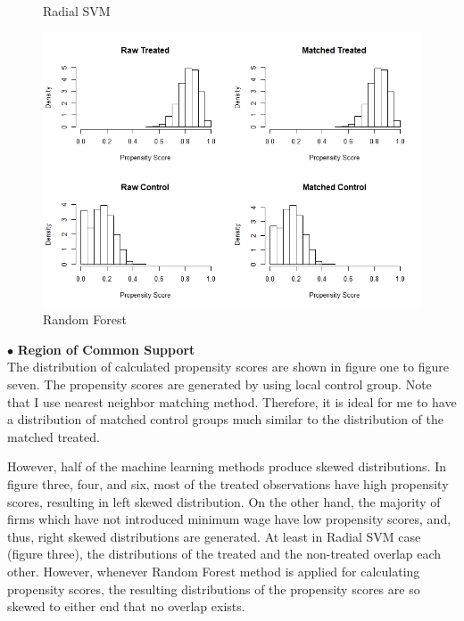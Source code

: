 \documentclass[11pt,a4paper,oneside]{article}
\begin{document}
\begin{figure}[!t]
  \caption{Radial SVM}\label{fig:histogram3}
\endminipage\hfill
{}
  \includegraphics[width=\linewidth]{Figures/local_rf_hist.jpeg}
  \caption{Random Forest}\label{fig:histogram4}
\endminipage\hfill
\end{figure}
$\bullet$ \textbf{Region of Common Support}\\
The distribution of calculated propensity scores are shown in figure one to figure seven. The propensity scores are generated by using local control group. Note that I use nearest neighbor matching method. Therefore, it is ideal for me to have a distribution of matched control groups much similar to the distribution of the matched treated. 
\par 
However, half of the machine learning methods produce skewed distributions. In figure three, four, and six, most of the treated observations have high propensity scores, resulting in left skewed distribution. On the other hand, the majority of firms which have not introduced minimum wage have low propensity scores, and, thus, right skewed distributions are generated. At least in Radial SVM case (figure three), the distributions of the treated and the non-treated overlap each other. However, whenever Random Forest method is applied for calculating propensity scores, the resulting distributions of the propensity scores are so skewed to either end that no overlap exists.
\end{document}
